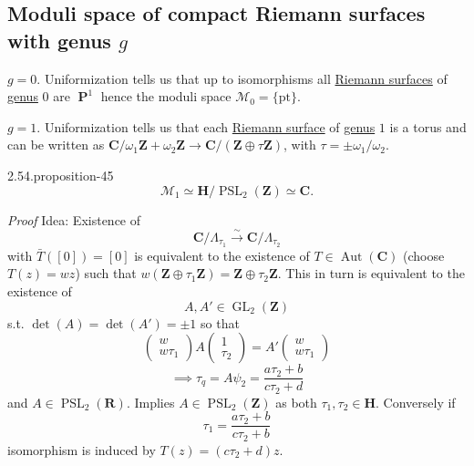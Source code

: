 \documentclass[10pt,]{book}
\makeatletter
\renewcommand*{\proofname}{Proof}
\renewenvironment{proof}[1][\proofname]{\par
  \pushQED{\qed}%
  \normalfont \topsep6\p@\@plus6\p@\relax
  \trivlist
  \item\relax
    {\itshape
    #1\@addpunct{.}}\hspace\labelsep\ignorespaces
}{%
  \popQED\endtrivlist\@endpefalse
}
\numberwithin{equation}{section}
\newcommand{\lb}{[}
\newcommand{\rb}{]}
\newcommand{\ZZ}{\mathbf{Z}}
\newcommand{\RR}{\mathbf{R}}
\newcommand{\CC}{\mathbf{C}}
\newcommand{\HH}{\mathbf{H}}
\DeclareMathOperator{\PP}{\mathbf{P}}
\DeclareMathOperator{\Aut}{Aut}
\DeclareMathOperator{\GL}{GL}
\DeclareMathOperator{\PSL}{PSL}
\makeatother
\begin{document}
\subsection[{Moduli space of compact Riemann surfaces with genus \(g\)}]{Moduli space of compact Riemann surfaces with genus \(g\)}\label{subsection-49}
\hypertarget{p-573}{}%
\(g =0\). Uniformization tells us that up to isomorphisms all \hyperref[def-top-riem-surface]{Riemann surfaces} of \hyperref[fact-existance-genus]{genus} \(0\) are \(\PP^1\) hence the moduli space \(\mathcal M _0  = \{\text{pt}\}\).%
\par
\hypertarget{p-574}{}%
\(g = 1\). Uniformization tells us that each \hyperref[def-top-riem-surface]{Riemann surface} of \hyperref[fact-existance-genus]{genus} \(1\) is a torus and can be written as \(\CC/ \omega_1\ZZ+ \omega_2\ZZ \to \CC/(\ZZ \oplus \tau \ZZ)\), with \(\tau = \pm \omega_1/\omega_2\).%
\begin{proposition}{2.54.}{}{proposition-45}%
\hypertarget{p-575}{}%
%
\begin{equation*}
\mathcal M_1 \simeq \HH/ \PSL_2(\ZZ) \simeq \CC\text{.}
\end{equation*}
%
\end{proposition}
\begin{proof}\hypertarget{proof-90}{}
\hypertarget{p-576}{}%
Idea: Existence of%
\begin{equation*}
\CC/ \Lambda_{\tau_1} \xrightarrow{\sim} \CC/\Lambda_{\tau_2}
\end{equation*}
with \(\bar T (\lb 0 \rb) = \lb 0 \rb\) is equivalent to the existence of \(T \in \Aut(\CC)\) (choose \(T(z) = wz\)) such that \(w(\ZZ\oplus \tau_1 \ZZ) = \ZZ\oplus \tau_2\ZZ\). This in turn is equivalent to the existence of%
\begin{equation*}
A,A' \in \GL_2(\ZZ)
\end{equation*}
s.t. \(\det (A) = \det(A') = \pm 1\) so that%
\begin{equation*}
\begin{pmatrix} w\\ w\tau_1 \end{pmatrix} A \begin{pmatrix}1\\ \tau_2\end{pmatrix} = A' \begin{pmatrix} w \\ w\tau_1 \end{pmatrix}
\end{equation*}
%
\begin{equation*}
\implies \tau_q = A \psi_2 = \frac{a\tau_2 + b}{c\tau_2 + d}
\end{equation*}
and \(A \in \PSL_2(\RR)\). Implies \(A\in \PSL_2(\ZZ)\) as both \(\tau_1,\tau_2 \in \HH\). Conversely if%
\begin{equation*}
\tau_1 = \frac{a\tau_2 + b}{c\tau_2 + b}
\end{equation*}
isomorphism is induced by \(T(z) = (c\tau_2 + d) z\).%
\end{proof}
\end{document}
